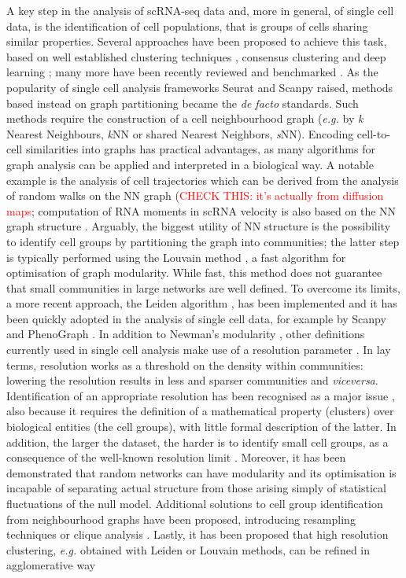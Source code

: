 \documentclass[10pt]{article}
\begin{document}
A key step in the analysis of scRNA-seq data and, more in general, of single cell data, is the identification of cell populations, that is groups of cells sharing similar properties. Several approaches have been proposed to achieve this task, based on well established clustering techniques \cite{wang_2017, lin_2017}, consensus clustering \cite{huh_2020, kiselev_2017, Ranjan_2021} and deep learning \cite{li_2020}; many more have been recently reviewed \cite{krzak_2019, kiselev_2019} and benchmarked \cite{du_2018}. As the popularity of single cell analysis frameworks Seurat \cite{butler_2018} and Scanpy \cite{wolf_2018} raised, methods based instead on graph partitioning became the \emph{de facto} standards. Such methods require the construction of a cell neighbourhood graph (\emph{e.g.} by \emph{k }Nearest Neighbours, \emph{k}NN or shared Nearest Neighbors, \emph{s}NN). Encoding cell-to-cell similarities into graphs has practical advantages, as many algorithms for graph analysis can be applied and interpreted in a biological way. A notable example is the analysis of cell trajectories which can be derived from the analysis of random walks on the NN graph (\textcolor{red}{CHECK THIS: it's actually from diffusion maps}; computation of RNA moments in scRNA velocity is also based on the NN graph structure \cite{Bergen_2020}. Arguably, the biggest utility of NN structure is the possibility to identify cell groups by partitioning the graph into communities; the latter step is typically performed using the Louvain method \cite{blondel_2008}, a fast algorithm for optimisation of graph modularity. While fast, this method does not guarantee that small communities in large networks are well defined. To overcome its limits, a more recent approach, the Leiden algorithm \cite{traag_2019}, has been implemented and it has been quickly adopted in the analysis of single cell data, for example by Scanpy \cite{wolf_2018} and PhenoGraph \cite{levine_2015}. In addition to Newman's modularity \cite{newman_2004}, other definitions currently used in single cell analysis make use of a resolution parameter \cite{traag_2011, reichardt_2006}. In lay terms, resolution works as a threshold on the density within communities: lowering the resolution results in less and sparser communities and \emph{viceversa}. Identification of an appropriate resolution has been recognised as a major issue \cite{lhnemann_2020}, also because it requires the definition of a mathematical property (clusters) over biological entities (the cell groups), with little formal description of the latter. In addition, the larger the dataset, the harder is to identify small cell groups, as a consequence of the well-known resolution limit \cite{fortunato_2007}. Moreover, it has been demonstrated that random networks can have modularity \cite{guimer_2004} and its optimisation is incapable of separating actual structure from those arising simply of statistical fluctuations of the null model. Additional solutions to cell group identification from neighbourhood graphs have been proposed, introducing resampling techniques \cite{baran_2019, Tang_Sackton_2020} or clique analysis \cite{xu_2015}. Lastly, it has been proposed that high resolution clustering, \emph{e.g.} obtained with Leiden or Louvain methods, can be refined in agglomerative way 
\end{document}
